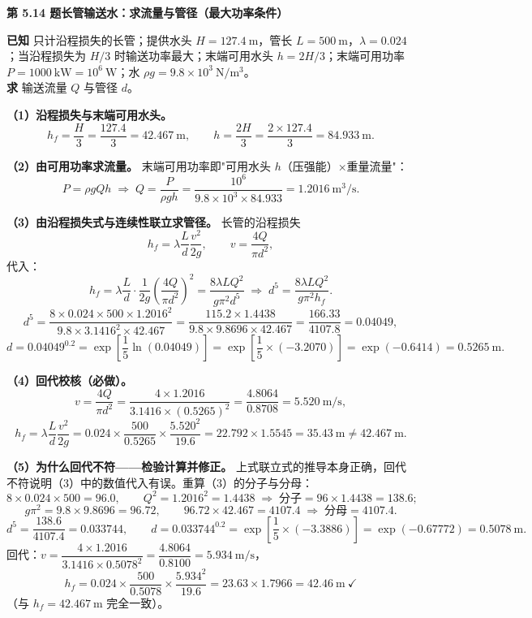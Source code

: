 \noindent\textbf{第 5.14 题\quad 长管输送水：求流量与管径（最大功率条件）}

\begin{jie}
\textbf{已知} 只计沿程损失的长管；提供水头 $H=127.4\ \mathrm{m}$，管长 $L=500\ \mathrm{m}$，$\lambda=0.024$；当沿程损失为 $H/3$ 时输送功率最大；末端可用水头 $h=2H/3$；末端可用功率 $P=1000\ \mathrm{kW}=10^6\ \mathrm{W}$；水 $\rho g=9.8\times10^3\ \mathrm{N/m^3}$。\\
\textbf{求} 输送流量 $Q$ 与管径 $d$。

\textbf{（1）沿程损失与末端可用水头。}
\[h_f=\frac{H}{3}=\frac{127.4}{3}=42.467\ \mathrm{m},\qquad
h=\frac{2H}{3}=\frac{2\times127.4}{3}=84.933\ \mathrm{m}.\]

\textbf{（2）由可用功率求流量。} 末端可用功率即"可用水头 $h$（压强能）×重量流量"：
\[P=\rho gQh\;\Longrightarrow\;Q=\frac{P}{\rho gh}=\frac{10^6}{9.8\times10^3\times84.933}=1.2016\ \mathrm{m^3/s}.\]

\textbf{（3）由沿程损失式与连续性联立求管径。} 长管的沿程损失
\[h_f=\lambda\frac{L}{d}\frac{v^2}{2g},\qquad v=\frac{4Q}{\pi d^2},\]
代入：
\[h_f=\lambda\frac{L}{d}\cdot\frac{1}{2g}\left(\frac{4Q}{\pi d^2}\right)^2
=\frac{8\lambda LQ^2}{g\pi^2d^5}
\;\Longrightarrow\;d^5=\frac{8\lambda LQ^2}{g\pi^2h_f}.\]
\[d^5=\frac{8\times0.024\times500\times1.2016^2}{9.8\times3.1416^2\times42.467}
=\frac{115.2\times1.4438}{9.8\times9.8696\times42.467}
=\frac{166.33}{4107.8}=0.04049,\]
\[d=0.04049^{0.2}=\exp\left[\frac{1}{5}\ln(0.04049)\right]=\exp\left[\frac{1}{5}\times(-3.2070)\right]=\exp(-0.6414)=0.5265\ \mathrm{m}.\]

\textbf{（4）回代校核（必做）。}
\[v=\frac{4Q}{\pi d^2}=\frac{4\times1.2016}{3.1416\times(0.5265)^2}=\frac{4.8064}{0.8708}=5.520\ \mathrm{m/s},\]
\[h_f=\lambda\frac{L}{d}\frac{v^2}{2g}=0.024\times\frac{500}{0.5265}\times\frac{5.520^2}{19.6}=22.792\times1.5545=35.43\ \mathrm{m}\ne42.467\ \mathrm{m}.\]

\textbf{（5）为什么回代不符——检验计算并修正。} 上式联立式的推导本身正确，回代不符说明（3）中的数值代入有误。重算（3）的分子与分母：
\[8\times0.024\times500=96.0,\qquad Q^2=1.2016^2=1.4438\;\Longrightarrow\;\text{分子}=96\times1.4438=138.6;\]
\[g\pi^2=9.8\times9.8696=96.72,\qquad 96.72\times42.467=4107.4\;\Longrightarrow\;\text{分母}=4107.4.\]
\[d^5=\frac{138.6}{4107.4}=0.033744,\qquad
d=0.033744^{0.2}=\exp\left[\frac{1}{5}\times(-3.3886)\right]=\exp(-0.67772)=0.5078\ \mathrm{m}.\]
回代：$v=\dfrac{4\times1.2016}{3.1416\times0.5078^2}=\dfrac{4.8064}{0.8100}=5.934\ \mathrm{m/s}$，
\[h_f=0.024\times\frac{500}{0.5078}\times\frac{5.934^2}{19.6}=23.63\times1.7966=42.46\ \mathrm{m}\ \checkmark\]
（与 $h_f=42.467\ \mathrm{m}$ 完全一致）。


\end{jie}
